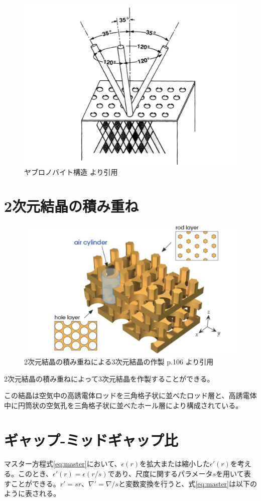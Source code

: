 \documentclass[platex,dvipdfmx,draft]{jsreport}
\numberwithin{equation}{section}
\begin{document}
\begin{figure}[htbp]
  \centering
  \includegraphics[width=0.6\linewidth]{yablonovite.png}
  \caption{ヤブロノバイト構造 \cite{orig}より引用}
  \label{fig:yablonovite_image}

\end{figure}


\section{2次元結晶の積み重ね}
\begin{figure}[htbp]
  \centering
  \includegraphics[width=0.6\linewidth]{2d.png}
  \caption{2次元結晶の積み重ねによる3次元結晶の作製 \cite{text} p.106 より引用}
  \label{fig:2d_3d}
\end{figure}

2次元結晶の積み重ねによって3次元結晶を作製することができる。

この結晶は空気中の高誘電体ロッドを三角格子状に並べたロッド層と、高誘電体中に円筒状の空気孔を三角格子状に並べたホール層により構成されている。

\section{ギャップ-ミッドギャップ比}
マスター方程式\ref{eq:master}において、$\epsilon(r)$を拡大または縮小した$\epsilon'(r)$を考える。このとき、$\epsilon'(r) = \epsilon(r / s)$であり、尺度に関するパラメータ$s$を用いて表すことができる。$r' = sr$、$\nabla' = \nabla / s$と変数変換を行うと、式\ref{eq:master}は以下のように表される。
\end{document}

